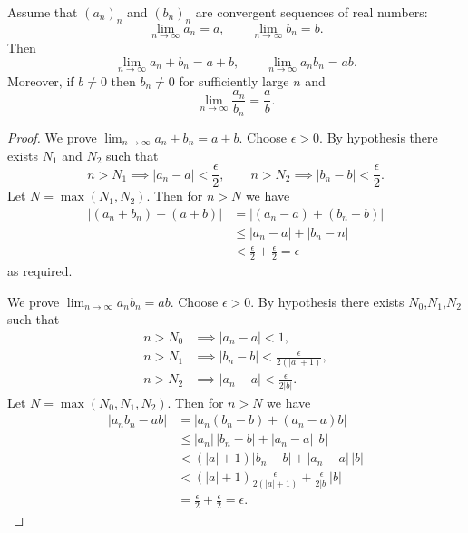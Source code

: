\documentclass[10pt,a4paper,UTF8]{article}
\begin{document}
\begin{theorem}
Assume that \((a_n)_n\) and \((b_n)_n\) are convergent sequences of real numbers:
\begin{equation*}
\lim_{n\to\infty} a_n = a, \qquad \lim_{n\to\infty} b_n=b.
\end{equation*}
Then
\begin{equation*}
\lim_{n\to\infty} a_n+b_n = a+b, \qquad \lim_{n\to\infty} a_nb_n = ab.
\end{equation*}
Moreover, if \(b\ne 0\) then \(b_n\ne 0\) for sufficiently large \(n\) and
\begin{equation*}
 \lim_{n\to\infty} \frac{a_n}{b_n} = \frac{a}{b}.
\end{equation*}
\end{theorem}

\begin{proof}
We prove \(\lim_{n\to\infty} a_n+b_n = a+b\). Choose \(\epsilon > 0\). By hypothesis there exists \(N_1\) and \(N_2\) such that
\begin{equation*}
  n > N_1\implies |a_n-a| < \frac{\epsilon}{2},\qquad n > N_2\implies |b_n-b| < \frac{\epsilon}{2}.
\end{equation*}
Let \(N=\max(N_1,N_2)\). Then for \(n > N\) we have
\begin{equation*}
\begin{aligned}
|(a_n+b_n)-(a+b)|
    &=|(a_n-a)+(b_n-b)|\\
    &\le |a_n-a|+|b_n-n|\\
    & < \frac{\epsilon}{2}+\frac{\epsilon}{2}=\epsilon
\end{aligned}
\end{equation*}
as required.


We prove \(\lim_{n\to\infty} a_nb_n = ab\). Choose \(\epsilon > 0\). By hypothesis there exists \(N_0\),\(N_1\),\(N_2\) such that
\begin{equation*}
\begin{aligned}
n > N_0&\implies |a_n-a| < 1,\\
n > N_1&\implies |b_n-b| < \frac{\epsilon}{2(|a|+1)},\\
n > N_2&\implies |a_n-a| < \frac{\epsilon}{2|b|}.
\end{aligned}
\end{equation*}
Let \(N=\max(N_0,N_1,N_2)\). Then for \(n > N\) we have
\begin{equation*}
\begin{aligned}
|a_nb_n-ab|&=|a_n(b_n-b)+(a_n-a)b|\\
&\le |a_n|\,|b_n-b|+|a_n-a|\,|b|\\
& < (|a|+1)|b_n-b|+|a_n-a|\,|b|\\
& <  (|a|+1)\frac{\epsilon}{2(|a|+1)}+\frac{\epsilon}{2|b|}|b|\\
&=\frac{\epsilon}{2}+\frac{\epsilon}{2}=\epsilon.
\end{aligned}
\end{equation*}



\end{proof}
\end{document}

